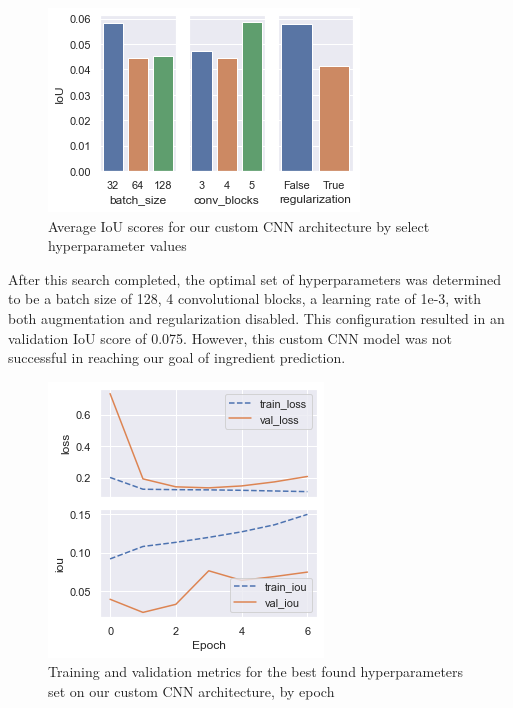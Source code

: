 \documentclass[10pt,twocolumn,letterpaper]{article}
\begin{document}
\begin{figure}[t]
\begin{center}
   \includegraphics[width=0.8\linewidth]{custom-iou-params.png}
\end{center}
\caption{Average IoU scores for our custom CNN architecture by select hyperparameter values}
\label{fig:onecol}
\end{figure}

After this search completed, the optimal set of hyperparameters was determined to be a batch size of 128, 4 convolutional blocks, a learning rate of 1e-3, with both augmentation and regularization disabled. This configuration resulted in an validation IoU score of 0.075. However, this custom CNN model was not successful in reaching our goal of ingredient prediction.

\begin{figure}[t]
\begin{center}
   \includegraphics[width=0.7\linewidth]{best-custom-run.png}
\end{center}
\caption{Training and validation metrics for the best found hyperparameters set on our custom CNN architecture, by epoch}
\label{fig:onecol}
\end{figure}
\end{document}

